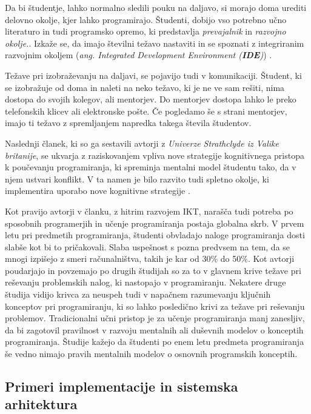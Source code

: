 Da bi študentje, lahko normalno sledili pouku na daljavo, si morajo
doma urediti delovno okolje, kjer lahko programirajo. Študenti,
dobijo vso potrebno učno literaturo in tudi programsko opremo, ki
predstavlja \emph{prevajalnik} in \emph{razvojno okolje.}. Izkaže se,
da imajo številni težavo nastaviti in se spoznati z integriranim
razvojnim okoljem (\emph{ang. Integrated Development Environment
  (\textbf{IDE})}) \cite{ITaLCP_DistanceEdu}.

Težave pri izobraževanju na daljavi, se pojavijo tudi v
komunikaciji. Študent, ki se izobražuje od doma in naleti na neko
težavo, ki je ne ve sam rešiti, nima dostopa do svojih kolegov, ali
mentorjev. Do mentorjev dostopa lahko le preko telefonskih klicev ali
elektronske pošte. Če pogledamo še s strani mentorjev, imajo ti težavo
z spremljanjem napredka takega števila študentov.


Naslednji članek, ki so ga sestavili avtorji z \emph{Univerze
  Strathclyde iz Valike britanije}, se ukvarja z raziskovanjem vpliva
nove strategije kognitivnega pristopa k poučevanju programiranja, ki
spreminja mentalni model študentu tako, da v njem ustvari konflikt. V
ta namen je bilo razvito tudi spletno okolje, ki implementira uporabo
nove kognitivne strategije \cite{mentalModels}.


Kot pravijo avtorji v članku, z hitrim razvojem IKT, narašča tudi
potreba po sposobnih programerjih in učenje programiranja postaja
globalna skrb. V prvem letu pri predmetih programiranja, študenti
obvladajo naloge programiranja dosti slabše kot bi to
pričakovali. Slaba uspešnost s pozna predvsem na tem, da se mnogi
izpišejo z smeri računalništva, takih je kar od 30\% do 50\%. Kot
avtorji poudarjajo in povzemajo po drugih študijah so za to v glavnem
krive težave pri reševanju problemskih nalog, ki nastopajo v
programiranju. Nekatere druge študija vidijo krivca za neuspeh tudi v
napačnem razumevanju ključnih konceptov pri programiranju, ki so lahko
posledično krivi za težave pri reševanju problemov. Tradicionalni učni
pristop je za učenje programiranja manj zanesljiv, da bi zagotovil
pravilnost v razvoju mentalnih ali duševnih modelov o
konceptih programiranja. Študije kažejo da študenti po enem letu
predmeta programiranja še vedno nimajo pravih mentalnih modelov o
osnovnih programskih konceptih.

\subsection{Primeri implementacije in sistemska arhitektura}
\label{sec:sistemska_arhitektura_All}

